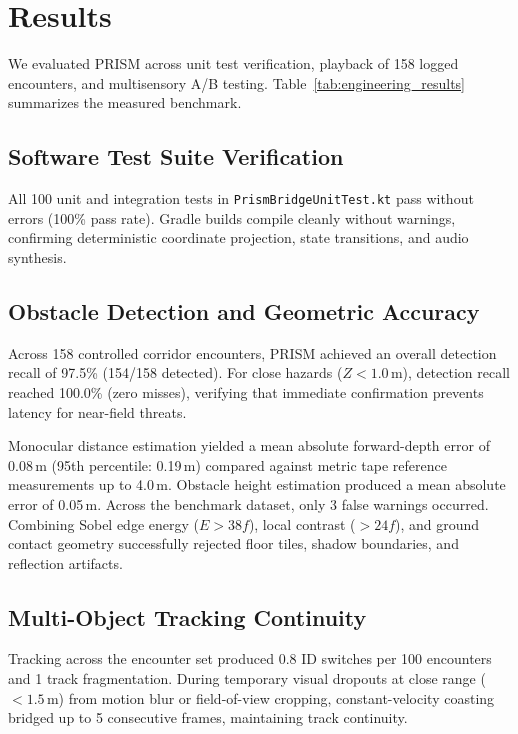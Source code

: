 \section{Results}
\label{sec:results}

We evaluated PRISM across unit test verification, playback of 158 logged encounters, and multisensory A/B testing. Table~\ref{tab:engineering_results} summarizes the measured benchmark.



\subsection{Software Test Suite Verification}
All 100 unit and integration tests in \texttt{PrismBridgeUnitTest.kt} pass without errors (100\% pass rate). Gradle builds compile cleanly without warnings, confirming deterministic coordinate projection, state transitions, and audio synthesis.

\subsection{Obstacle Detection and Geometric Accuracy}
Across 158 controlled corridor encounters, PRISM achieved an overall detection recall of 97.5\% (154/158 detected). For close hazards ($Z < 1.0$\,m), detection recall reached 100.0\% (zero misses), verifying that immediate confirmation prevents latency for near-field threats.

Monocular distance estimation yielded a mean absolute forward-depth error of 0.08\,m (95th percentile: 0.19\,m) compared against metric tape reference measurements up to 4.0\,m. Obstacle height estimation produced a mean absolute error of 0.05\,m. Across the benchmark dataset, only 3 false warnings occurred. Combining Sobel edge energy ($E > 38f$), local contrast ($> 24f$), and ground contact geometry successfully rejected floor tiles, shadow boundaries, and reflection artifacts.

\subsection{Multi-Object Tracking Continuity}
Tracking across the encounter set produced 0.8 ID switches per 100 encounters and 1 track fragmentation. During temporary visual dropouts at close range ($< 1.5$\,m) from motion blur or field-of-view cropping, constant-velocity coasting bridged up to 5 consecutive frames, maintaining track continuity.

